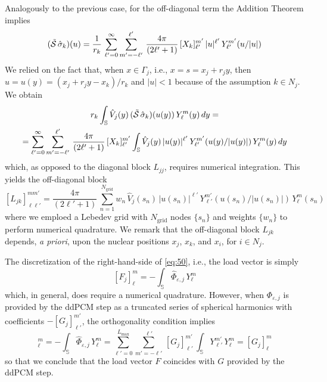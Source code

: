 Analogously to the previous case, for the off-diagonal term the Addition Theorem implies
\[
(\tilde{\mathcal{S}} \, \hat{\sigma}_k)(u) = \frac{1}{r_k} \, \sum_{\ell'= 0}^{\infty} \sum_{m' = -\ell'}^{\ell'} \, \frac{4\pi}{(2\ell' + 1)}\, [X_k]_{\ell'}^{m'} \, |u|^{\ell'} \, Y_{\ell'}^{m'}(u/|u|)
\]
We relied on the fact that, when $x \in \Gamma_j$, i.e., $x = s = x_j + r_j y$, then $u = u(y) = (x_j + r_j y -x_k)/r_k$ and $|u| < 1$ because of the assumption $k \in N_j$. We obtain
\begin{multline*}
 r_k \int_\mathbb{S} \hat{V}_j(y) \, (\tilde{\mathcal{S}} \, \hat{\sigma}_k)(u(y)) \, Y_\ell^m(y) \, dy = \\
=  \sum_{\ell'= 0}^{\infty} \sum_{m' = -\ell'}^{\ell'} \, \frac{4\pi}{(2\ell' + 1)}\, [X_k]_{\ell'}^{m'} \int_\mathbb{S} \hat{V}_j(y) \, |u(y)|^{\ell'} \, Y_{\ell'}^{m'}(u(y)/|u(y)|) \, Y_\ell^m(y) \, dy
\end{multline*}
which, as opposed to the diagonal block $L_{jj}$, requires numerical integration.
This yields the off-diagonal block
\begin{equation}\label{eq:62}
[L_{jk}]_{\ell \ell'}^{m m'} =  \frac{4\pi}{(2\ell' + 1)}\, \sum_{n = 1}^{N_\text{grid}} w_n \, \hat{V}_j(s_n) \, |u(s_n)|^{\ell'} \, Y_{\ell'}^{m'}(u(s_n)/|u(s_n)|) \, Y_\ell^m(s_n)
\end{equation}
where we emploed a Lebedev grid with $N_\text{grid}$ nodes $\{s_n\}$ and weights $\{ w_n \}$ to perform numerical quadrature. We remark that the off-diagonal block $L_{jk}$ depends, \emph{a priori}, upon the nuclear positions $x_j$, $x_k$, and $x_i$, for $i \in N_j$.

The discretization of the right-hand-side of \eqref{eq:50}, i.e., the load vector is simply
\[
[F_j]_\ell^m = - \int_\mathbb{S} \hat{\Phi}_{\varepsilon,j} \, Y_\ell^m
\]
which, in general, does require a numerical quadrature. However, when $\Phi_{\varepsilon,j}$ is provided by the ddPCM step as a truncated series of spherical harmonics with coefficients $-[G_j]_{\ell'}^{m'}$, the orthogonality condition implies
\begin{equation*}
[F_j]_\ell^m = - \int_\mathbb{S} \hat{\Phi}_{\varepsilon,j} \, Y_\ell^m =  \sum_{\ell'= 0}^{L_\text{max}} \sum_{m' = -\ell'}^{\ell'} \, [G_j]_{\ell'}^{m'} \,  \int_{\mathbb{S}}  Y_{\ell'}^{m'} \, Y_\ell^m =  [G_j]_\ell^m
\end{equation*}
so that we conclude that the load vector $F$ coincides with $G$ provided by the ddPCM step.